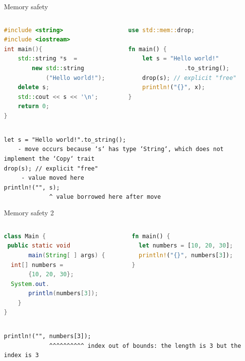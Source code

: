 \documentclass[10pt]{beamer}
\begin{document}
\begin{frame}[fragile]{Memory safety}
	\begin{columns}
        \begin{column}{0.5\textwidth}
            \begin{lstlisting}[language=c++]
#include <string>
#include <iostream>
int main(){
    std::string *s  = 
        new std::string
            ("Hello world!");
    delete s;
    std::cout << s << '\n';
    return 0;
}
            \end{lstlisting}
        \end{column}
        
        \vrule{}
        \begin{column}{0.5\textwidth}
            \begin{lstlisting}[language=rust]
use std::mem::drop; 

fn main() {
    let s = "Hello world!"
                .to_string();
    drop(s); // explicit "free"
    println!("{}", x);
}
            \end{lstlisting}
        
        \end{column}
    \end{columns}
    \texttt{let s = "Hello world!".to\_string();\\
~~~~- move occurs because `s` has type `String`, which does not implement the `Copy` trait\\
   drop(s); // explicit "free"\\
~~~~~- value moved here\\
   println!("{}", s);\\
~~~~~~~~~~~~ \^{} value borrowed here after move}
\end{frame}

\begin{frame}[fragile]{Memory safety 2}
   \begin{columns}
        \begin{column}{0.5\textwidth}
            \begin{lstlisting}[language=java]
class Main {
 public static void 
       main(String[ ] args) {
  int[] numbers = 
       {10, 20, 30};
  System.out.
       println(numbers[3]);
    }
}
            \end{lstlisting}
        \end{column}
        
        \vrule{}
        \begin{column}{0.5\textwidth}
            \begin{lstlisting}[language=rust]
fn main() {
  let numbers = [10, 20, 30];
  println!("{}", numbers[3]);
}
            \end{lstlisting}
        
        \end{column}
    \end{columns}
    \texttt{println!("{}", numbers[3]);\\
   ~~~~~~~~~~~~~\^{}\^{}\^{}\^{}\^{}\^{}\^{}\^{}\^{}\^{} index out of bounds: the length is 3 but the index is 3
}
\end{frame}
\end{document}
